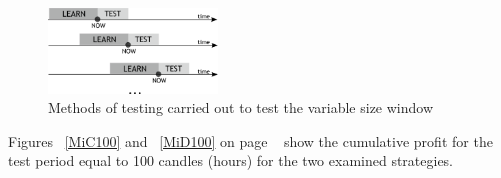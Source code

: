\documentclass{tewiart}
\begin{document}
\begin{figure}[h!]
\begin{center}
\includegraphics[width=0.4\textwidth]{pictures/metodyka_badan.png}
\caption{Methods of testing carried out to test the variable size window}
\label{research_methods}
\end{center}
\end{figure}
\FloatBarrier

Figures ~\ref{MiC100} and ~\ref{MiD100} on page ~\pageref{MiD100} show the cumulative profit for the test period equal to 100 candles (hours) for the two examined strategies.
\end{document}
